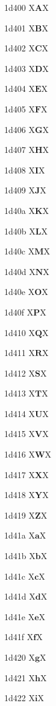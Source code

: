 \documentclass[11pt]{article}
\begin{document}
1d400 X{\ensuremath{\mathbf{A}}}X

1d401 X{\ensuremath{\mathbf{B}}}X

1d402 X{\ensuremath{\mathbf{C}}}X

1d403 X{\ensuremath{\mathbf{D}}}X

1d404 X{\ensuremath{\mathbf{E}}}X

1d405 X{\ensuremath{\mathbf{F}}}X

1d406 X{\ensuremath{\mathbf{G}}}X

1d407 X{\ensuremath{\mathbf{H}}}X

1d408 X{\ensuremath{\mathbf{I}}}X

1d409 X{\ensuremath{\mathbf{J}}}X

1d40a X{\ensuremath{\mathbf{K}}}X

1d40b X{\ensuremath{\mathbf{L}}}X

1d40c X{\ensuremath{\mathbf{M}}}X

1d40d X{\ensuremath{\mathbf{N}}}X

1d40e X{\ensuremath{\mathbf{O}}}X

1d40f X{\ensuremath{\mathbf{P}}}X

1d410 X{\ensuremath{\mathbf{Q}}}X

1d411 X{\ensuremath{\mathbf{R}}}X

1d412 X{\ensuremath{\mathbf{S}}}X

1d413 X{\ensuremath{\mathbf{T}}}X

1d414 X{\ensuremath{\mathbf{U}}}X

1d415 X{\ensuremath{\mathbf{V}}}X

1d416 X{\ensuremath{\mathbf{W}}}X

1d417 X{\ensuremath{\mathbf{X}}}X

1d418 X{\ensuremath{\mathbf{Y}}}X

1d419 X{\ensuremath{\mathbf{Z}}}X

1d41a X{\ensuremath{\mathbf{a}}}X

1d41b X{\ensuremath{\mathbf{b}}}X

1d41c X{\ensuremath{\mathbf{c}}}X

1d41d X{\ensuremath{\mathbf{d}}}X

1d41e X{\ensuremath{\mathbf{e}}}X

1d41f X{\ensuremath{\mathbf{f}}}X

1d420 X{\ensuremath{\mathbf{g}}}X

1d421 X{\ensuremath{\mathbf{h}}}X

1d422 X{\ensuremath{\mathbf{i}}}X
\end{document}
